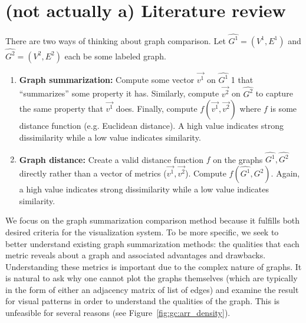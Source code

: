 \section{(not actually a) Literature review}
\label{sec:gc:litreview}

There are two ways of thinking about graph comparison. Let 
$\hat{G^1}=(V^1,E^1)$ and $\hat{G^2}=(V^2,E^2)$ each be some labeled graph. 

\tablespacing
\begin{enumerate}
	\item \textbf{Graph summarization:} Compute some vector 
	$\overrightarrow{v^1}$ on $\hat{G^1}$ 1 that ``summarizes'' some property 
	it has. Similarly, compute $\overrightarrow{v^2}$ on $\hat{G^2}$ to capture 
	the same property that $\overrightarrow{v^1}$ does. Finally, compute 
	$f(\overrightarrow{v^1},\overrightarrow{v^2})$ where $f$ is some distance 
	function (e.g. Euclidean distance). A high value indicates strong 
	dissimilarity while a low value indicates similarity. 
	
	\item \textbf{Graph distance:} Create a valid distance function $f$ on the 
	graphs $\hat{G^1}, \hat{G^2}$ directly rather than a vector of metrics 
	($\overrightarrow{v^1},\overrightarrow{v^2}$). 
	Compute $f(\hat{G^1},\hat{G^2})$. Again, a high value indicates strong 
	dissimilarity while a low value indicates similarity. 
\end{enumerate}
\bodyspacing

We focus on the graph summarization comparison method because it fulfills both 
desired criteria for the visualization system. To be more specific, we seek to 
better understand existing graph summarization methods: the qualities that each 
metric reveals about a graph and associated advantages and drawbacks. 
Understanding these metrics is important due to the complex nature of graphs.
It is natural to ask why one cannot plot the graphs themselves (which are 
typically in the form of either an adjacency matrix of list of edges) and 
examine the result for visual patterns in order to understand the qualities 
of the graph. This is unfeasible for several reasons (see 
Figure~\ref{fig:gc:arr_density}). 

